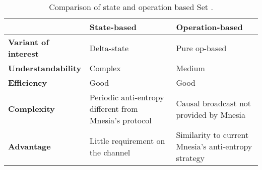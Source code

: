 \begin{table}[htp]
  \centering
  \begin{tabular}{p{}p{}p{}}
    \toprule
    &   State-based & Operation-based \\ \midrule
    \textbf{Variant of interest} & Delta-state & Pure op-based \\ \midrule
    \textbf{Understandability} & Complex & Medium \\ \midrule
    \textbf{Efficiency} & Good & Good \\ \midrule
    \textbf{Complexity} & Periodic anti-entropy different from Mnesia's protocol & Causal broadcast not provided by Mnesia \\ \midrule
    \textbf{Advantage} & Little requirement on the channel & Similarity to current Mnesia's anti-entropy strategy \\
    \bottomrule
  \end{tabular}
  \caption{Comparison of state and operation based Set .}
  \label{tab:crdt comparison}

\end{table}
